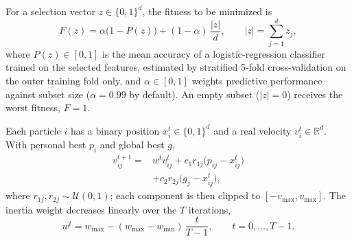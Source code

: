 
For a selection vector $z \in \{0,1\}^d$, the fitness to be minimized is
\begin{equation}
F(z) = \alpha \bigl(1 - P(z)\bigr) + (1-\alpha)\,\frac{|z|}{d},
\qquad |z| = \sum_{j=1}^{d} z_j ,
\label{eq:fitness}
\end{equation}
where $P(z)\in[0,1]$ is the mean accuracy of a logistic-regression classifier
trained on the selected features, estimated by stratified 5-fold cross-validation
on the outer training fold only, and $\alpha \in [0,1]$ weights predictive
performance against subset size ($\alpha = 0.99$ by default). An empty subset
($|z| = 0$) receives the worst fitness, $F = 1$.

Each particle $i$ has a binary position $x_i^t \in \{0,1\}^d$ and a real
velocity $v_i^t \in \mathbb{R}^d$. With personal best $p_i$ and global best $g$,
\begin{equation}
\begin{split}
v_{ij}^{t+1} = {} & w^{t} v_{ij}^{t}
  + c_1 r_{1j}\bigl(p_{ij} - x_{ij}^{t}\bigr) \\
  & + c_2 r_{2j}\bigl(g_{j} - x_{ij}^{t}\bigr),
\end{split}
\label{eq:velocity}
\end{equation}
where $r_{1j}, r_{2j} \sim \mathcal{U}(0,1)$; each component is then clipped to
$[-v_{\max}, v_{\max}]$.
The inertia weight decreases linearly over the $T$ iterations,
\begin{equation}
w^{t} = w_{\max} - (w_{\max} - w_{\min})\,\frac{t}{T-1},
\qquad t = 0,\ldots,T-1 .
\label{eq:inertia}
\end{equation}

